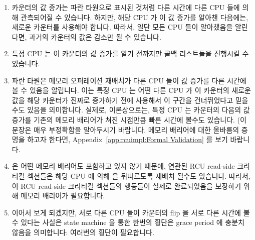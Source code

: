 \begin{enumerate}
\item	{} 카운터의 값 증가는 파란 타원으로 표시된
	것처럼 다른 시간에 다른 CPU 들에 의해 관측되어질 수 있습니다.  하지만,
	해당 CPU 가 이 값 증가를 알아챈 다음에는, 새로운 카운터를 사용해야
	합니다.
	따라서, 일단 모든 CPU 들이 알아챘음을 알린다면, 과거의 카운터의 값은
	감소만 될 수 있습니다.
\item	특정 CPU 는 이 카운터의 값 증가를 알기 전까지만 콜백 리스트들을
	진행시킬 수 있습니다.
\item	파란 타원은 메모리 오퍼레이션 재배치가 다른 CPU 들이 값 증가를 다른
	시간에 볼 수 있음을 알립니다.
	이는 특정 CPU 는 어떤 다른 CPU 가 이 카운터의 새로운 값을 해당 카운터가
	진짜로 증가하기 전에 사용해서 이 구간을 건너뛰었다고 믿을 수도 있음을
	의미합니다.
	실제로, 이론상으로는, 특정 CPU 는  카운터의
	다음의 값 증가를 기존의 메모리 배리어가 쳐진 시점만큼 빠른 시간에
	볼수도 있습니다.
	(이 문장은 매우 부정확함을 알아두시기 바랍니다.
	메모리 배리어에 대한 올바름의 증명을 하고자 한다면,
	Appendix~\ref{app:rcuimpl:Formal Validation} 를 보기 바랍니다.

\item	{} 은 어떤 메모리 배리어도 포함하고 있지 않기 때문에,
	연관된 RCU read-side 크리티컬 섹션들은 해당 CPU 에 의해
	 을 뒤따르도록 재배치 될수도 있습니다.
	따라서, 이 RCU read-side 크리티컬 섹션들의 행동들이 실제로 완료되었음을
	보장하기 위해 메모리 배리어가 필요합니다.
\item	이어서 보게 되겠지만, 서로 다른 CPU 들이 카운터의 flip 을 서로 다른
	시간에 볼 수 있다는 사실은 state machine 을 통한 한번의 횡단은 grace
	period 에 충분치 않음을 의미합니다: 여러번의 횡단이 필요합니다.
\iffalse


\end{enumerate}
